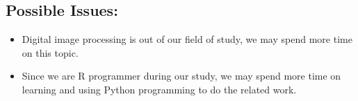 \documentclass{article}
\begin{document}
\begin{normalsize}
    	\section{Possible Issues:}
    	\begin{itemize}
    	    \item Digital image processing is out of our field of study, we may spend more time on this topic.
    	    \item Since we are R programmer during our study, we may spend more time on learning and using Python programming to do the related work.  
    	\end{itemize}
\end{normalsize}
  
\end{document}
